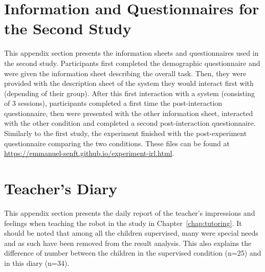 \cleartooddpage
\chapter{Information and Questionnaires for the Second Study} \label{app:control_questionnaires}
This appendix section presents the information sheets and questionnaires used in the second study. Participants first completed the demographic questionnaire and were given the information sheet describing the overall task. Then, they were provided with the description sheet of the system they would interact first with (depending of their group). After this first interaction with a system (consisting of 3 sessions), participants completed a first  time the post-interaction questionnaire, then were presented with the other information sheet, interacted with the other condition and completed a second post-interaction questionnaire. Similarly to the first study, the experiment finished with the post-experiment questionnaire comparing the two conditions. These files can be found at \url{https://emmanuel-senft.github.io/experiment-irl.html}.

\cleartooddpage
\chapter{Teacher's Diary} \label{app:diary}
This appendix section presents the daily report of the teacher's impressions and feelings when teaching the robot in the study in Chapter~\ref{chap:tutoring}. It should be noted that among all the children supervised, many were special needs and as such have been removed from the result analysis. This also explains the difference of number between the children in the supervised condition (n=25) and in this diary (n=34).

